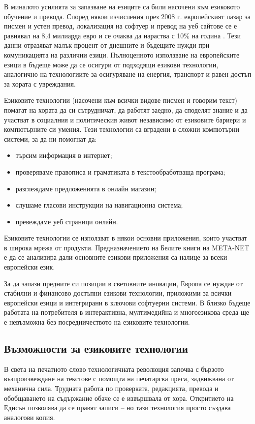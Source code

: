 \documentclass[]{../../metanetpaper}
\begin{document}
\begin{multicols}{2}
В миналото усилията за запазване на езиците са били насочени
 към езиковото обучение и превода. Според някои
 изчисления през 2008 г. европейският пазар за писмен и
 устен превод, локализация на софтуер и превод на
 уеб сайтове се е равнявал на 8,4 милиарда евро и се
 очаква да нараства с 10\% на година \cite{EC3}. Тези данни отразяват малък процент от днешните и бъдещите нужди при комуникацията на различни езици.
Пълноценното използване на европейските езици в бъдеще може да се осигури от подходящи езикови технологии, аналогично на технологиите за осигуряване  на енергия, транспорт и равен достъп за хората с увреждания.  

Езиковите технологии (насочени към всички видове писмен и говорим текст) помагат на хората да си сътрудничат, да работят заедно, да споделят знание и да участват в социалния и
 политическия живот независимо от езиковите бариери и компютърните си умения. Тези технологии са вградени в сложни компютърни системи, за да ни помогнат да:

\begin{itemize}
\item търсим информация в интернет;
\item проверяваме правописа и граматиката в текстообработваща програма;
\item разглеждаме предложенията в онлайн магазин;
\item слушаме гласови инструкции на навигационна система;
\item превеждаме уеб страници онлайн.
\end{itemize}

Езиковите технологии се използват в някои основни приложения, които участват в широка мрежа от продукти. Предназначението на Белите книги на META-NET е да се анализира дали основните езикови приложения са налице за всеки европейски език.

За да запази предните си позиции в световните иновации, Европа се нуждае от стабилни и финансово достъпни езикови технологии, приложими за всички европейски езици и интегрирани в ключови софтуерни системи.
В близко бъдеще работата на потребителя в интерактивна, мултимедийна и многоезикова  среда ще е  невъзможна
без посредничеството на езиковите технологии.

\subsection{Възможности за езиковите технологии}

В света на печатното слово технологичната революция започва с бързото възпроизвеждане на текстове с помощта на печатарска преса, задвижвана от механична сила. Трудната работа по проверката, редакцията, превода и обобщаването на съдържание обаче се е извършвала от хора. Откритието на Едисън позволява да се правят записи – но тази технология просто създава аналогови копия.


\end{multicols}
\end{document}
